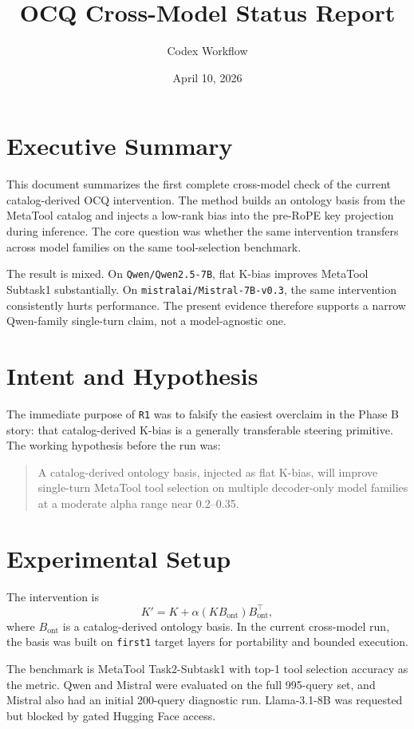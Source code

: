 \documentclass[11pt,a4paper]{article}
\title{OCQ Cross-Model Status Report}
\author{Codex Workflow}
\date{April 10, 2026}
\begin{document}
\maketitle

\section{Executive Summary}

This document summarizes the first complete cross-model check of the current
catalog-derived OCQ intervention. The method builds an ontology basis from the
MetaTool catalog and injects a low-rank bias into the pre-RoPE key projection
during inference. The core question was whether the same intervention transfers
across model families on the same tool-selection benchmark.

The result is mixed. On \texttt{Qwen/Qwen2.5-7B}, flat K-bias improves MetaTool
Subtask1 substantially. On \texttt{mistralai/Mistral-7B-v0.3}, the same
intervention consistently hurts performance. The present evidence therefore
supports a narrow Qwen-family single-turn claim, not a model-agnostic one.

\section{Intent and Hypothesis}

The immediate purpose of \texttt{R1} was to falsify the easiest overclaim in
the Phase B story: that catalog-derived K-bias is a generally transferable
steering primitive. The working hypothesis before the run was:

\begin{quote}
A catalog-derived ontology basis, injected as flat K-bias, will improve
single-turn MetaTool tool selection on multiple decoder-only model families at
a moderate alpha range near 0.2--0.35.
\end{quote}

\section{Experimental Setup}

The intervention is
\[
K' = K + \alpha (K B_{\mathrm{ont}}) B_{\mathrm{ont}}^{\top},
\]
where \(B_{\mathrm{ont}}\) is a catalog-derived ontology basis. In the current
cross-model run, the basis was built on \texttt{first1} target layers for
portability and bounded execution.

The benchmark is MetaTool Task2-Subtask1 with top-1 tool selection accuracy as
the metric. Qwen and Mistral were evaluated on the full 995-query set, and
Mistral also had an initial 200-query diagnostic run. Llama-3.1-8B was
requested but blocked by gated Hugging Face access.
\end{document}
